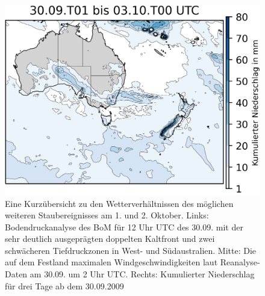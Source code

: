 \documentclass[12pt,a4paper,onecolumn]{scrartcl}
\begin{document}
\begin{figure}[!htb]
\begin{minipage}[c]{0.35\textwidth}
	\end{minipage}\hfill
	\begin{minipage}[c]{0.33\textwidth}
		\includegraphics[width=\textwidth]{bilder/rain_october_small.png}
	\end{minipage}\hfill
	\caption{Eine Kurzübersicht zu den Wetterverhältnissen des möglichen weiteren Staubereignisses am 1. und 2. Oktober. Links: Bodendruckanalyse des BoM für 12 Uhr UTC des 30.09. mit der sehr deutlich ausgeprägten doppelten Kaltfront und zwei schwächeren Tiefdruckzonen in West- und Südaustralien. Mitte: Die auf dem Festland maximalen Windgeschwindigkeiten laut Reanalyse-Daten am 30.09. um 2 Uhr UTC. Rechts: Kumulierter Niederschlag für drei Tage ab dem 30.09.2009} \label{fig:october_weather}
\end{figure}
\end{document}
